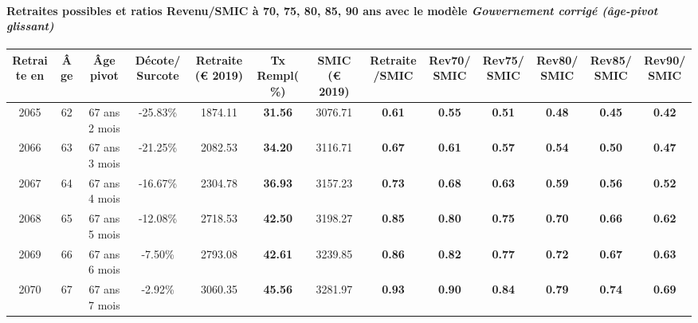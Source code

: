 \paragraph{Retraites possibles et ratios Revenu/SMIC à 70, 75, 80, 85, 90 ans avec le modèle \emph{Gouvernement corrigé (âge-pivot glissant)}}  
 
{ \scriptsize \begin{center} 
\begin{tabular}[htb]{|c|c||c|c||c|c||c||c|c|c|c|c|c|} 
\hline 
 Retraite en &  Âge &  Âge pivot &  Décote/Surcote &  Retraite (\euro{} 2019) &  Tx Rempl(\%) &  SMIC (\euro{} 2019) &  Retraite/SMIC &  Rev70/SMIC &  Rev75/SMIC &  Rev80/SMIC &  Rev85/SMIC &  Rev90/SMIC \\ 
\hline \hline 
 2065 &  62 &  67 ans 2 mois &  -25.83\% &  1874.11 &  {\bf 31.56} &  3076.71 &  {\bf {\color{red} 0.61}} &  {\bf {\color{red} 0.55}} &  {\bf {\color{red} 0.51}} &  {\bf {\color{red} 0.48}} &  {\bf {\color{red} 0.45}} &  {\bf {\color{red} 0.42}} \\ 
\hline 
 2066 &  63 &  67 ans 3 mois &  -21.25\% &  2082.53 &  {\bf 34.20} &  3116.71 &  {\bf {\color{red} 0.67}} &  {\bf {\color{red} 0.61}} &  {\bf {\color{red} 0.57}} &  {\bf {\color{red} 0.54}} &  {\bf {\color{red} 0.50}} &  {\bf {\color{red} 0.47}} \\ 
\hline 
 2067 &  64 &  67 ans 4 mois &  -16.67\% &  2304.78 &  {\bf 36.93} &  3157.23 &  {\bf {\color{red} 0.73}} &  {\bf {\color{red} 0.68}} &  {\bf {\color{red} 0.63}} &  {\bf {\color{red} 0.59}} &  {\bf {\color{red} 0.56}} &  {\bf {\color{red} 0.52}} \\ 
\hline 
 2068 &  65 &  67 ans 5 mois &  -12.08\% &  2718.53 &  {\bf 42.50} &  3198.27 &  {\bf {\color{red} 0.85}} &  {\bf {\color{red} 0.80}} &  {\bf {\color{red} 0.75}} &  {\bf {\color{red} 0.70}} &  {\bf {\color{red} 0.66}} &  {\bf {\color{red} 0.62}} \\ 
\hline 
 2069 &  66 &  67 ans 6 mois &  -7.50\% &  2793.08 &  {\bf 42.61} &  3239.85 &  {\bf {\color{red} 0.86}} &  {\bf {\color{red} 0.82}} &  {\bf {\color{red} 0.77}} &  {\bf {\color{red} 0.72}} &  {\bf {\color{red} 0.67}} &  {\bf {\color{red} 0.63}} \\ 
\hline 
 2070 &  67 &  67 ans 7 mois &  -2.92\% &  3060.35 &  {\bf 45.56} &  3281.97 &  {\bf {\color{red} 0.93}} &  {\bf {\color{red} 0.90}} &  {\bf {\color{red} 0.84}} &  {\bf {\color{red} 0.79}} &  {\bf {\color{red} 0.74}} &  {\bf {\color{red} 0.69}} \\ 
\hline 
\hline 
\end{tabular} 
\end{center} } 
